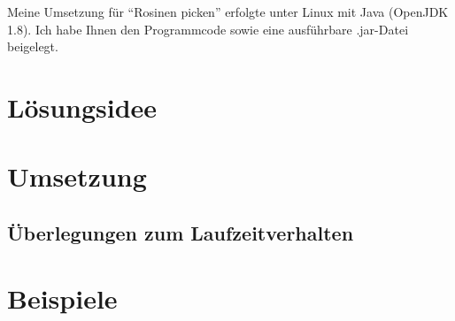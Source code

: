 \documentclass[a4paper, DIV=12, firstfoot=false]{scrreprt}
\newcommand{\task}[1]{Rosinen picken}
\begin{document}
	\titlehead{Teilnahme 6745 (Team 00001) \hfill Laurenz Grote}
	\title{\task}
	\subtitle{Aufgabe 1}
	\author{Laurenz Friedrich Grote}
	\date{}
	\maketitle
	\tableofcontents
	\vspace {2em}
	Meine Umsetzung für "`\task{}"' erfolgte unter Linux mit Java (OpenJDK 1.8). Ich habe Ihnen den Programmcode sowie eine ausführbare .jar-Datei beigelegt.
	\pagebreak
	\chapter{Lösungsidee}
		
	\chapter{Umsetzung}
		
		\section{Überlegungen zum Laufzeitverhalten}
			
	\chapter{Beispiele}
		
\end{document}
